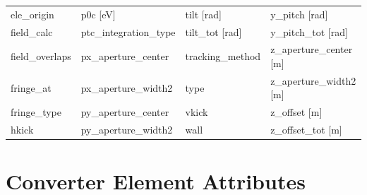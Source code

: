 \begin{tabular}{llll}
ele_origin                       & p0c [eV]                         & tilt [rad]                       & y_pitch [rad]                    \\
field_calc                       & ptc_integration_type             & tilt_tot [rad]                   & y_pitch_tot [rad]                \\
field_overlaps                   & px_aperture_center               & tracking_method                  & z_aperture_center [m]            \\
fringe_at                        & px_aperture_width2               & type                             & z_aperture_width2 [m]            \\
fringe_type                      & py_aperture_center               & vkick                            & z_offset [m]                     \\
hkick                            & py_aperture_width2               & wall                             & z_offset_tot [m]                 \\
 \bottomrule
 \end{tabular}
 \vfill
 
 \section{Converter Element Attributes}
 \label{s:list.converter}
 
